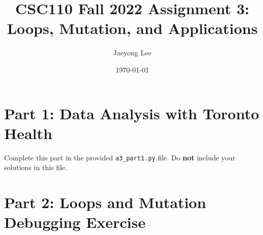 \documentclass[11pt]{article}
\title{CSC110 Fall 2022 Assignment 3: Loops, Mutation, and Applications}
\author{Jaeyong Lee}
\date{\today}
\begin{document}
\maketitle

\section*{Part 1: Data Analysis with Toronto Health}

Complete this part in the provided \texttt{a3\_part1.py} file.
Do \textbf{not} include your solutions in this file.

\section*{Part 2: Loops and Mutation Debugging Exercise}
\end{document}
